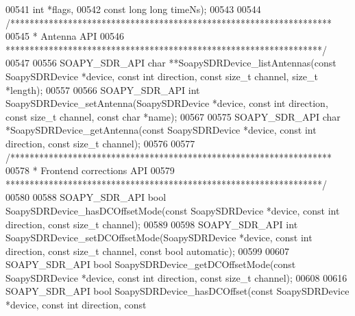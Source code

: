 \begin{DoxyCode}
00541     \textcolor{keywordtype}{int} *flags,
00542     \textcolor{keyword}{const} \textcolor{keywordtype}{long} \textcolor{keywordtype}{long} timeNs);
00543 
00544 \textcolor{comment}{/*******************************************************************}
00545 \textcolor{comment}{ * Antenna API}
00546 \textcolor{comment}{ ******************************************************************/}
00547 
00556 SOAPY_SDR_API \textcolor{keywordtype}{char} **SoapySDRDevice_listAntennas(\textcolor{keyword}{const} SoapySDRDevice *device, \textcolor{keyword}{const} \textcolor{keywordtype}{int} direction, \textcolor{keyword}{const} \textcolor{keywordtype}{
      size\_t} channel, \textcolor{keywordtype}{size\_t} *length);
00557 
00566 SOAPY_SDR_API \textcolor{keywordtype}{int} SoapySDRDevice_setAntenna(SoapySDRDevice *device, \textcolor{keyword}{const} \textcolor{keywordtype}{int} direction, \textcolor{keyword}{const} \textcolor{keywordtype}{size\_t} 
      channel, \textcolor{keyword}{const} \textcolor{keywordtype}{char} *name);
00567 
00575 SOAPY_SDR_API \textcolor{keywordtype}{char} *SoapySDRDevice_getAntenna(\textcolor{keyword}{const} SoapySDRDevice *device, \textcolor{keyword}{const} \textcolor{keywordtype}{int} direction, \textcolor{keyword}{const} \textcolor{keywordtype}{
      size\_t} channel);
00576 
00577 \textcolor{comment}{/*******************************************************************}
00578 \textcolor{comment}{ * Frontend corrections API}
00579 \textcolor{comment}{ ******************************************************************/}
00580 
00588 SOAPY_SDR_API \textcolor{keywordtype}{bool} SoapySDRDevice_hasDCOffsetMode(\textcolor{keyword}{const} SoapySDRDevice *device, \textcolor{keyword}{const} \textcolor{keywordtype}{int} direction, \textcolor{keyword}{const} \textcolor{keywordtype}{
      size\_t} channel);
00589 
00598 SOAPY_SDR_API \textcolor{keywordtype}{int} SoapySDRDevice_setDCOffsetMode(SoapySDRDevice *device, \textcolor{keyword}{const} \textcolor{keywordtype}{int} direction, \textcolor{keyword}{const} \textcolor{keywordtype}{size\_t} 
      channel, \textcolor{keyword}{const} \textcolor{keywordtype}{bool} automatic);
00599 
00607 SOAPY_SDR_API \textcolor{keywordtype}{bool} SoapySDRDevice_getDCOffsetMode(\textcolor{keyword}{const} SoapySDRDevice *device, \textcolor{keyword}{const} \textcolor{keywordtype}{int} direction, \textcolor{keyword}{const} \textcolor{keywordtype}{
      size\_t} channel);
00608 
00616 SOAPY_SDR_API \textcolor{keywordtype}{bool} SoapySDRDevice_hasDCOffset(\textcolor{keyword}{const} SoapySDRDevice *device, \textcolor{keyword}{const} \textcolor{keywordtype}{int} direction, \textcolor{keyword}{const} \textcolor{keywordtype}{
}
\end{DoxyCode}
